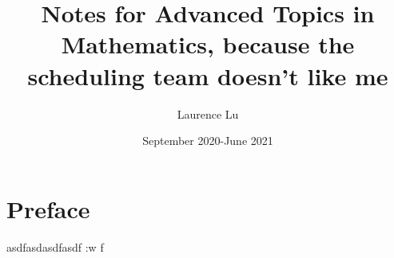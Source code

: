 \documentclass{report}
\title{Notes for Advanced Topics in Mathematics, because the scheduling team doesn't like me}
\author{Laurence Lu}
\date{September 2020-June 2021}
\theoremstyle{plain}
\theoremstyle{definition}
\theoremstyle{remark}
\begin{document}
\maketitle

\section*{Preface}
\cite{apostol_1969}asdfasdasdfasdf
:w
f


{}

\end{document}
